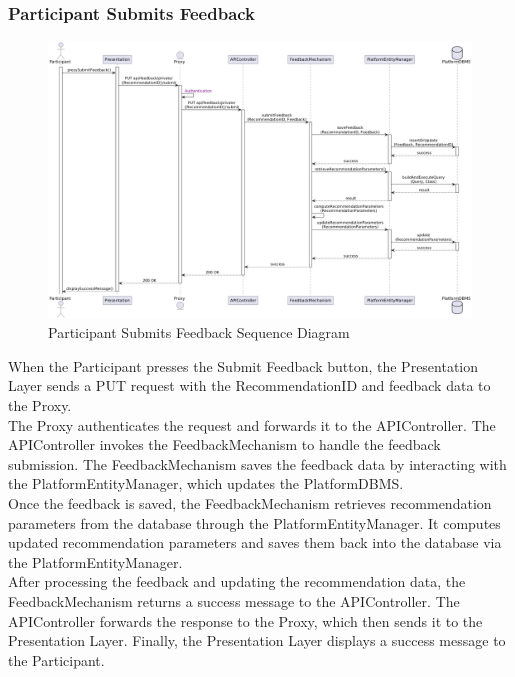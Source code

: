 \subsubsection*{Participant Submits Feedback}
\begin{figure}[H]
    \centering
    \includegraphics[width=\linewidth]{Latex/Images/DD/SequenceDiagrams/6.2ParticipantSubmitsFeedback.png}
    \caption{Participant Submits Feedback Sequence Diagram}
    \label{fig:partsubfeedback}
\end{figure}
When the Participant presses the Submit Feedback button, the Presentation Layer sends a PUT request with the RecommendationID and feedback data to the Proxy.\\
The Proxy authenticates the request and forwards it to the APIController. The APIController invokes the FeedbackMechanism to handle the feedback submission. The FeedbackMechanism saves the feedback data by interacting with the PlatformEntityManager, which updates the PlatformDBMS.\\
Once the feedback is saved, the FeedbackMechanism retrieves recommendation parameters from the database through the PlatformEntityManager. It computes updated recommendation parameters and saves them back into the database via the PlatformEntityManager.\\
After processing the feedback and updating the recommendation data, the FeedbackMechanism returns a success message to the APIController. The APIController forwards the response to the Proxy, which then sends it to the Presentation Layer. Finally, the Presentation Layer displays a success message to the Participant.
